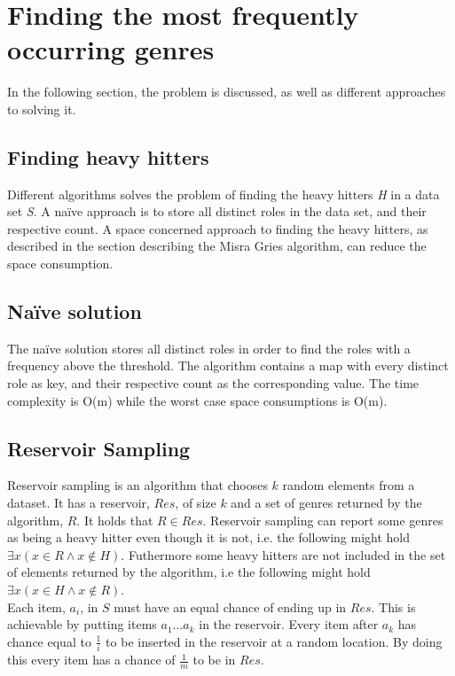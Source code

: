 
\section{Finding the most frequently occurring genres}
In the following section, the problem is discussed, as well as different approaches to solving it.

\subsection{Finding heavy hitters}
Different algorithms solves the problem of finding the heavy hitters \textit{H} in a data set \textit{S}. A naïve approach is to store all distinct roles in the data set, and their respective count. A space concerned approach to finding the heavy hitters, as described in the section describing the Misra Gries algorithm, can reduce the space consumption.

\subsection{Naïve solution}
The naïve solution stores all distinct roles in order to find the roles with a frequency above the threshold. The algorithm contains a map with every distinct role as key, and their respective count as the corresponding value. The time complexity is O(m) while the worst case space consumptions is O(m).

\subsection{Reservoir Sampling}
Reservoir sampling is an algorithm that chooses \(k\) random elements from a dataset. It has a reservoir, \(Res\), of size \(k\) and a set of genres returned by the algorithm, \(R\). It holds that \(R \in Res\). Reservoir sampling can report some genres as being a heavy hitter even though it is not, i.e. the following might hold \(\exists x \left(x \in R \land x \notin H \right)\). Futhermore some heavy hitters are not included in the set of elements returned by the algorithm, i.e the following might hold \(\exists x \left(x \in H \land x \notin R \right)\).\\

Each item, \(a_i\), in \(S\) must have an equal chance of ending up in \(Res\). This is achievable by putting items \(a_1 \dots a_k\) in the reservoir. Every item after \(a_k\) has chance equal to \(\frac{1}{i}\) to be inserted in the reservoir at a random location. By doing this every item has a chance of \(\frac{1}{m}\) to be in \(Res\).

